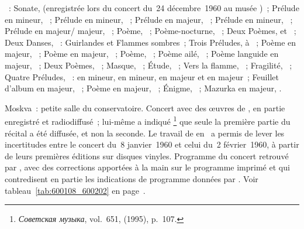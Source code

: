 \begin{description}
 \textsc{\Scriabine{}}~: Sonate,  (enregistrée lors du concert
 du~24 décembre~1960 au musée \Scriabine{})~; Prélude en \kG \Sharp mineur,
  ~; Prélude en \kG \Sharp mineur, 
 ~; Prélude en \kG \Flat majeur,  ~; Prélude
 en \kB \Flat mineur,  ~; Prélude en \kD \Flat majeur/\kC
 majeur,  ~; Poème, ~; Poème-nocturne,
 ~; Deux Poèmes,   et ~; Deux Danses,
 ~:  Guirlandes et  Flammes sombres~; Trois
 Préludes,   à ~; Poème en \kC majeur,
  ~; Poème en \kC majeur,  ~; Poème,
  ~; Poème ailé,  ~; Poème languide en
 \kB majeur,  ~; Deux Poèmes, ~; Masque,
  ~; Étude,  ~; Vers la flamme,
 ~; Fragilité,  ~; Quatre Préludes, ~:
  en \kA mineur,  en \kE mineur,  en \kD
 majeur et  en \kE \Flat majeur~; Feuillet d'album en \kE \Flat
 majeur,  ~; Poème en \kF \Sharp majeur, 
 ~; Énigme,  ~; Mazurka en \kF \Sharp majeur,
  .
 \item[\DateWithWeekDay{1960-01-08}]
 Moskva~: petite salle du conservatoire.
 Concert avec des œuvres de \Scriabine{}, en partie enregistré et
 radiodiffusé~; \VSofronitsky{} lui-même a indiqué%
 \footnote{\foreignlanguage{russian}{\emph{Советская музыка}}, vol.~651,
  (1995), p.~107.}
 que seule la première partie du récital a été diffusée, et non la seconde.
 Le travail de \citeauthor{Malik} en~\citeyear{Malik} a permis de lever les
 incertitudes entre le concert du~8 janvier~1960 et celui du~2 février~1960,
 à partir de leurs premières éditions sur disques vinyles.
 Programme du concert retrouvé par \citet{TADGO1960}, avec des corrections
 apportées à la main sur le programme imprimé et qui contredisent en partie
 les indications de programme données par \citet[p.~182]{Nekrasova08}.
 Voir tableau~\ref{tab:600108_600202} en page~\pageref{tab:600108_600202}.


\end{description}
